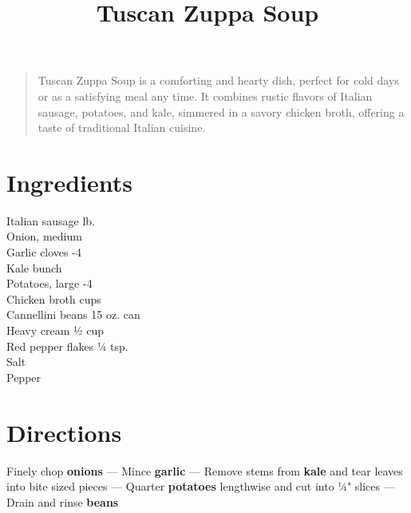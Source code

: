 \documentclass[11pt,letterpaper]{article}
\title{Tuscan Zuppa Soup}
\author{}
\date{}
\begin{document}
\maketitle
\thispagestyle{empty}

\begin{quote}
\small
\begin{em}
Tuscan Zuppa Soup is a comforting and hearty dish, perfect for cold days or as a satisfying meal any time. It combines rustic flavors of Italian sausage, potatoes, and kale, simmered in a savory chicken broth, offering a taste of traditional Italian cuisine.
\end{em}
\end{quote}

\section*{Ingredients}
\setlength{\columnsep}{20pt}
\begin{multicols}{2}
\noindent
    Italian sausage  lb. \\
    Onion, medium  \\
    Garlic cloves -4 \\
    Kale  bunch \\
    Potatoes, large -4 \\
    \columnbreak
    Chicken broth  cups \\
    Cannellini beans  15 oz. can \\
    Heavy cream \dotfill ½ cup \\
    Red pepper flakes \dotfill ¼ tsp. \\
    Salt \dotfill \\
    Pepper \dotfill
\end{multicols}

\section*{Directions}

\noindent
Finely chop \textbf{onions} ---
Mince \textbf{garlic} ---
Remove stems from \textbf{kale} and tear leaves into bite sized pieces ---
Quarter \textbf{potatoes} lengthwise and cut into ¼" slices ---
Drain and rinse \textbf{beans}
\end{document}
